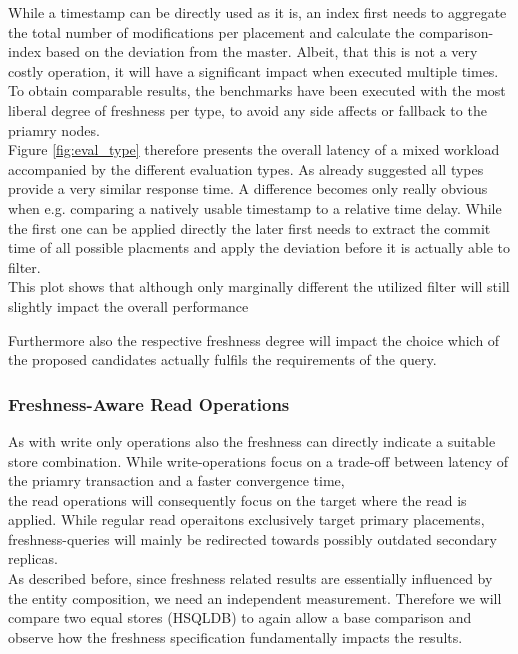 While a timestamp can be directly used as it is, an index first needs to aggregate the total number of modifications per placement and 
calculate the comparison-index based on the deviation from the master.
Albeit, that this is not a very costly operation, it will have a significant impact when executed multiple times.
To obtain comparable results, the benchmarks have been executed with the most liberal degree of freshness per type, to avoid any side affects or fallback to the priamry nodes.\\

Figure \ref{fig:eval_type} therefore presents the overall latency of a mixed workload accompanied by the different evaluation types.
As already suggested all types provide a very similar response time. A difference becomes only really obvious when e.g. comparing a natively usable
timestamp to a relative time delay. While the first one can be applied directly the later first
needs to extract the commit time of all possible placments and apply the deviation before it is actually able to filter.\\
This plot shows that although only marginally different the utilized filter will still slightly impact the overall performance

Furthermore also the respective freshness degree will impact the choice which of the proposed candidates actually fulfils the requirements of the query.




\subsubsection{Freshness-Aware Read Operations}

As with write only operations also the freshness can directly indicate a suitable store combination.
While write-operations focus on a trade-off between latency of the priamry transaction and a faster convergence time,\\
the read operations will consequently focus on the target where the read is applied. While regular read operaitons exclusively target
primary placements, freshness-queries will mainly be redirected towards possibly outdated secondary replicas.\\


As described before, since freshness related results are essentially influenced by the entity composition, we need an independent measurement.
Therefore we will  compare two equal stores (HSQLDB) to again allow a base comparison and observe how the freshness specification fundamentally impacts the results.\\


